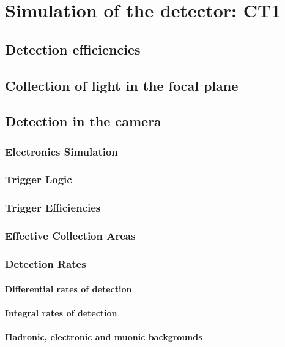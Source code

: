 

\chapter{Simulation of the detector: CT1}
\label{chapter:ct1sim}

\section{Detection efficiencies}

\section{Collection of light in the focal plane}

\section{Detection in the camera}

\subsection{Electronics Simulation}

\subsection{Trigger Logic}

\subsection{Trigger Efficiencies}

\subsection{Effective Collection Areas}

\subsection{Detection Rates}

\subsubsection{Differential rates of detection}

\subsubsection{Integral rates of detection}

\subsubsection{Hadronic, electronic and muonic backgrounds}

\endinput
%

